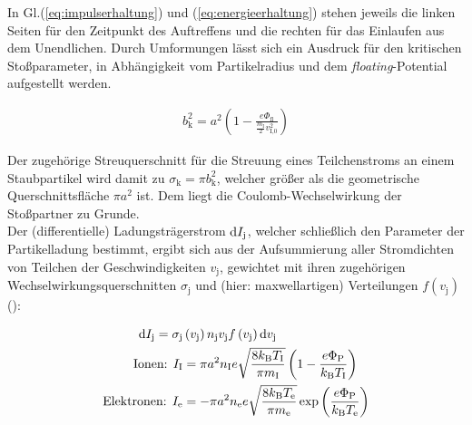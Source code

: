 \documentclass[numbers=noenddot,a4paper]{scrartcl}
\newcommand{\diff}{\textnormal{d}}
\newcommand{\ix}[1]{_\text{#1}}
\newcommand{\tilt}[1]{\textit{#1}}
\begin{document}
			In Gl.(\ref{eq:impulserhaltung}) und (\ref{eq:energieerhaltung}) stehen jeweils die linken Seiten für den Zeitpunkt des Auftreffens und die rechten für das Einlaufen aus dem Unendlichen. Durch Umformungen lässt sich ein Ausdruck für den kritischen Stoßparameter, in Abhängigkeit vom Partikelradius und dem \tilt{floating}-Potential aufgestellt werden.

				\begin{align}
					b\ix{k}^2=a^2\left(1-\frac{e\Phi\ix{fl}}{\frac{m\ix{I}}{2}v\ix{I,0}^2}\right) \label{eq:krit}
				\end{align}

			Der zugehörige Streuquerschnitt für die Streuung eines Teilchenstroms an einem Staubpartikel wird damit zu $\sigma\ix{k}=\pi b\ix{k}^2$, welcher größer als die geometrische Querschnittsfläche $\pi a^2$ ist. Dem liegt die Coulomb-Wechselwirkung der Stoßpartner zu Grunde.\\
			Der (differentielle) Ladungsträgerstrom $\diff I\ix{j}$, welcher schließlich den Parameter der Partikelladung bestimmt, ergibt sich aus der Aufsummierung aller Stromdichten von Teilchen der Geschwindigkeiten $v\ix{j}$, gewichtet mit ihren zugehörigen Wechselwirkungsquerschnitten $\sigma\ix{j}$ und (hier: maxwellartigen) Verteilungen $f\left(v\ix{j}\right)$ (\cite{Melzer12}):

				\begin{align}
					\diff I\ix{j}=\sigma\ix{j}&\left(v\ix{j}\right)n\ix{j}v\ix{j}f\left(v\ix{j}\right)\diff v\ix{j} \nonumber \\
					\text{Ionen: } I\ix{I}&=\pi a^2n\ix{I}e\sqrt{\frac{8k\ix{B}T\ix{I}}{\pi m\ix{I}}}\left(1-\frac{e\Phi\ix{P}}{k\ix{B}T\ix{I}}\right) \label{eq:ionenstrom} \\
					\text{Elektronen: } I\ix{e}&=-\pi a^2n\ix{e}e\sqrt{\frac{8k\ix{B}T\ix{e}}{\pi m\ix{e}}}\exp\left(\frac{e\Phi\ix{P}}{k\ix{B}T\ix{e}}\right) \label{eq:elektronenstrom}
				\end{align}
\end{document}
